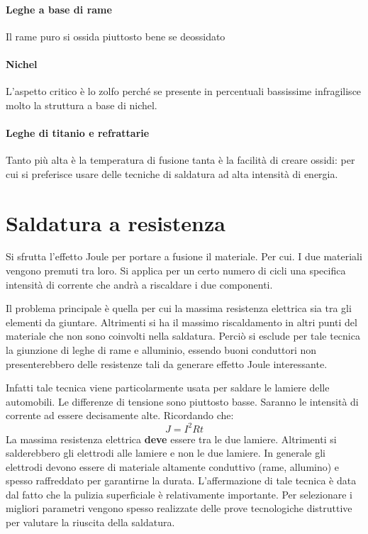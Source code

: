 \paragraph{Leghe a base di rame} Il rame puro si ossida piuttosto bene se deossidato
\paragraph{Nichel} L'aspetto critico è lo zolfo perché se presente in percentuali bassissime infragilisce molto la struttura a base di nichel.
\paragraph{Leghe di titanio e refrattarie} Tanto più alta è la temperatura di fusione tanta è la facilità di creare ossidi: per cui si preferisce usare delle tecniche di saldatura ad alta intensità di energia.

\section{Saldatura a resistenza}
Si sfrutta l'effetto Joule per portare a fusione il materiale.
Per cui. I due materiali vengono premuti tra loro. Si applica per un certo numero di cicli una specifica intensità di corrente che andrà a riscaldare i due componenti.

Il problema principale è quella per cui la massima resistenza elettrica sia tra gli elementi da giuntare. Altrimenti si ha il massimo riscaldamento in altri punti del materiale che non sono coinvolti nella saldatura.
Perciò si esclude per tale tecnica la giunzione di leghe di rame e alluminio, essendo buoni conduttori non presenterebbero delle resistenze tali da generare effetto Joule interessante.

Infatti tale tecnica viene particolarmente usata per saldare le lamiere delle automobili.
Le differenze di tensione sono piuttosto basse. Saranno le intensità di corrente ad essere decisamente alte. Ricordando che:
\begin{equation}
J = I^2Rt
\end{equation}
La massima resistenza elettrica \textbf{deve} essere tra le due lamiere.
Altrimenti si salderebbero gli elettrodi alle lamiere e non le due lamiere.
In generale gli elettrodi devono essere di materiale altamente conduttivo (rame, allumino) e spesso raffreddato per garantirne la durata.
L'affermazione di tale tecnica è data dal fatto che la pulizia superficiale è relativamente importante. Per selezionare i migliori parametri vengono spesso realizzate delle prove tecnologiche distruttive per valutare la riuscita della saldatura.

